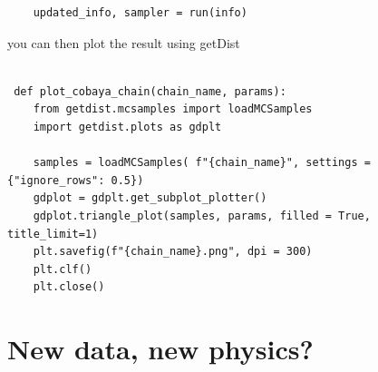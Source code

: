 \documentclass[a4paper]{article}
\newcommand{\subscript}[2]{$#1 _ #2$}
\begin{document}
\begin{enumerate}[label=(\subscript{I}{{\arabic*}})]
\begin{lstlisting}
    updated_info, sampler = run(info)
\end{lstlisting}

you can then plot the result using getDist 
 
  \begin{lstlisting}

 def plot_cobaya_chain(chain_name, params):
    from getdist.mcsamples import loadMCSamples
    import getdist.plots as gdplt

    samples = loadMCSamples( f"{chain_name}", settings = {"ignore_rows": 0.5})
    gdplot = gdplt.get_subplot_plotter()
    gdplot.triangle_plot(samples, params, filled = True, title_limit=1)
    plt.savefig(f"{chain_name}.png", dpi = 300)
    plt.clf()
    plt.close()
\end{lstlisting}
\end{enumerate}

\section{New data, new physics?}
\end{document}
